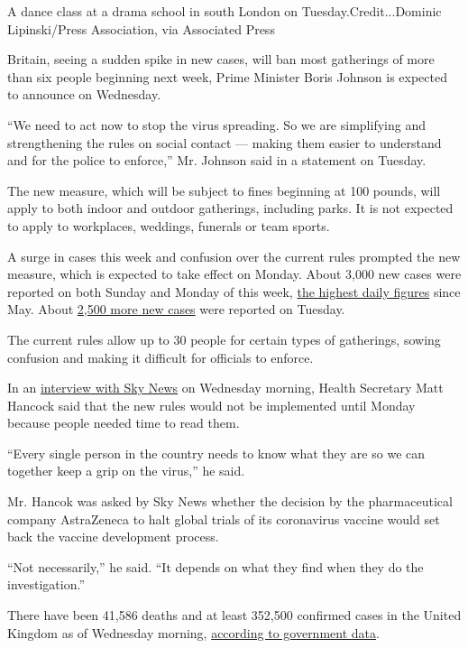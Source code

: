 A dance class at a drama school in south London on
Tuesday.Credit...Dominic Lipinski/Press Association, via Associated
Press

Britain, seeing a sudden spike in new cases, will ban most gatherings of
more than six people beginning next week, Prime Minister Boris Johnson
is expected to announce on Wednesday.

``We need to act now to stop the virus spreading. So we are simplifying
and strengthening the rules on social contact --- making them easier to
understand and for the police to enforce,'' Mr. Johnson said in a
statement on Tuesday.

The new measure, which will be subject to fines beginning at 100 pounds,
will apply to both indoor and outdoor gatherings, including parks. It is
not expected to apply to workplaces, weddings, funerals or team sports.

A surge in cases this week and confusion over the current rules prompted
the new measure, which is expected to take effect on Monday. About 3,000
new cases were reported on both Sunday and Monday of this week,
\href{https://www.nytimes3xbfgragh.onion/interactive/2020/world/europe/united-kingdom-coronavirus-cases.html\#cases}{the
highest daily figures} since May. About
\href{https://coronavirus.data.gov.uk/}{2,500 more new cases} were
reported on Tuesday.

The current rules allow up to 30 people for certain types of gatherings,
sowing confusion and making it difficult for officials to enforce.

In an
\href{https://news.sky.com/story/coronavirus-latest-news-live-we-need-to-act-now-to-stop-the-virus-spreading-warns-boris-johnson-12067052}{interview
with Sky News} on Wednesday morning, Health Secretary Matt Hancock said
that the new rules would not be implemented until Monday because people
needed time to read them.

``Every single person in the country needs to know what they are so we
can together keep a grip on the virus,'' he said.

Mr. Hancok was asked by Sky News whether the decision by the
pharmaceutical company AstraZeneca to halt global trials of its
coronavirus vaccine would set back the vaccine development process.

``Not necessarily,'' he said. ``It depends on what they find when they
do the investigation.''

There have been 41,586 deaths and at least 352,500 confirmed cases in
the United Kingdom as of Wednesday morning,
\href{https://www.nytimes3xbfgragh.onion/interactive/2020/world/europe/united-kingdom-coronavirus-cases.html}{according
to government data}.

